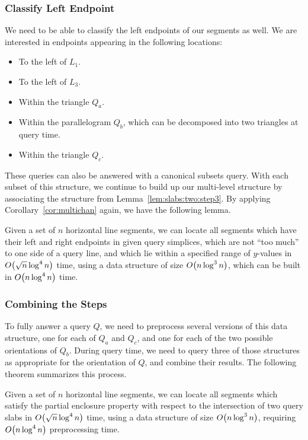 \subsubsection{Classify Left Endpoint}

We need to be able to classify the left endpoints of our segments as well. We are interested in endpoints appearing in the following locations:
\begin{itemize}
 \item To the left of $L_1$.
 \item To the left of $L_3$.
 \item Within the triangle $Q_a$.
 \item Within the parallelogram $Q_b$, which can be decomposed into two triangles at query time.
 \item Within the triangle $Q_c$.
\end{itemize}

These queries can also be answered with a canonical subsets query. 
With each subset of this structure, we continue to build up our multi-level structure by associating the structure from Lemma~\ref{lem:slabs:two:step3}. 
By applying Corollary~\ref{cor:multichan} again, we have the following lemma.

\begin{lemma}
\label{lem:slabs:two:step4}
Given a set of $n$ horizontal line segments, we can locate all segments which have their left and right endpoints in given query simplices, which are not ``too much'' to one side of a query line, and which lie within a specified range of $y$-values in $O\!\left(\sqrt{n}\log^4{n}\right)$ time, using a data structure of size $O\!\left(n\log^3{n}\right)$, which can be built in $O\!\left(n\log^4{n}\right)$ time.
\end{lemma}


\subsubsection{Combining the Steps}

To fully answer a query $Q$, we need to preprocess several versions of this data structure, one for each of $Q_a$ and $Q_c$, and one for each of the two possible orientations of $Q_b$.
During query time, we need to query three of those structures as appropriate for the orientation of $Q$, and combine their results. 
The following theorem summarizes this process.

\begin{theorem}
\label{th:slabs:two}
Given a set of $n$ horizontal line segments, we can locate all segments which satisfy the partial enclosure property with respect to the intersection of two query slabs in $O\!\left(\sqrt{n}\log^4{n}\right)$ time, using a data structure of size $O\!\left(n\log^3{n}\right)$, requiring $O\!\left(n\log^4{n}\right)$ preprocessing time.
\end{theorem}



